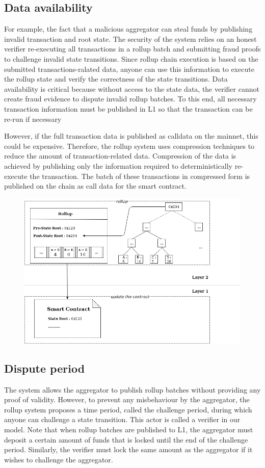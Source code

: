 \documentclass{article}
\begin{document}
\subsection{Data availability}

For example, the fact that a malicious aggregator can steal funds by publishing invalid transaction and root state. The security of the system relies on an honest verifier re-executing all transactions in a rollup batch and submitting fraud proofs to challenge invalid state transitions. Since rollup chain execution is based on the submitted transactions-ralated data, anyone can use this information to execute the rollup state and verify the correctness of the state transitions.
Data availability is critical because without access to the state data, the verifier cannot create fraud evidence to dispute invalid rollup batches. To this end, all necessary transaction information must be published in L1 so that the transaction can be re-run if necessary 

However, if the full transaction data is published as calldata on the mainnet, this could be expensive. Therefore, the rollup system uses compression techniques to reduce the amount of transaction-related data. Compression of the data is achieved by publishing only the information required to deterministically re-execute the transaction. The batch of these transactions in compressed form is published on the chain as call data for the smart contract.
\begin{figure}[t]
\includegraphics[width=12cm]{rollup-batch-data}
\centering
\end{figure}
\subsection{Dispute period}
The system allows the aggregator to publish rollup batches without providing any proof of validity. However, to prevent any misbehaviour by the aggregator, the rollup system proposes a time period, called the challenge period, during which anyone can challenge a state transition. This actor is called a verifier in our model. Note that when rollup batches are published to L1, the aggregator must deposit a certain amount of funds that is locked until  the end of the challenge period. Similarly, the verifier must lock the same amount as the aggregator if it wishes to challenge the aggregator.
\end{document}
